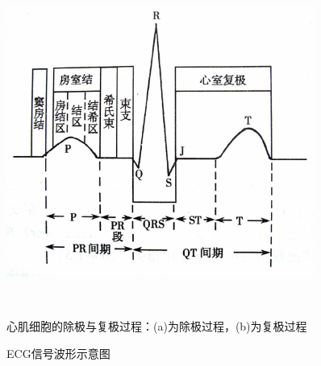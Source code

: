 \begin{figure}[htb]
\begin{center}
\begin{minipage}[b]{0.55\linewidth}
\begin{center}
\end{center}
\end{minipage}
~~~~
\begin{minipage}[b]{0.4\linewidth}
  \includegraphics[width=0.9\textwidth]{fig3-2.png}  
\end{minipage}\\[-10pt]
\begin{minipage}[t]{0.55\linewidth}
\caption{\label{fig3-1}心肌细胞的除极与复极过程：(a)为除极过程，(b)为复极过程}
\end{minipage}
\begin{minipage}[t]{0.4\linewidth}
\caption{\label{fig3-2}ECG信号波形示意图}
\end{minipage}
\end{center}
\end{figure}

